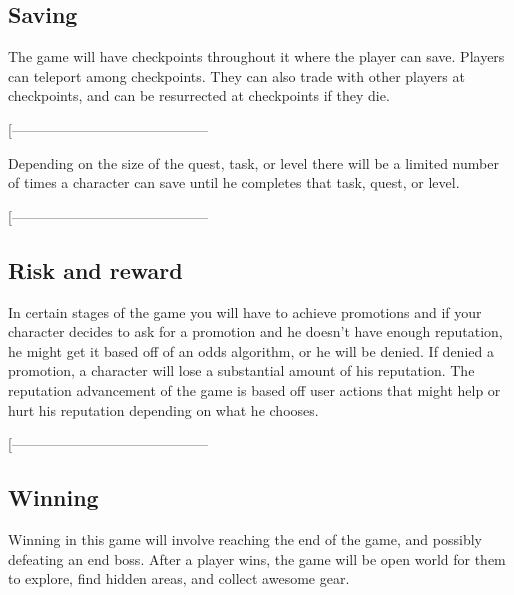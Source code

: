 \documentclass[9pt]{article}
\begin{document}
\subsection*{Saving}
The game will have checkpoints throughout it where the player can save. 
Players can teleport among checkpoints. They can also trade with other 
players at checkpoints, and can be resurrected at checkpoints if they die. 

\smallskip
[------------------------------------------
\smallskip

Depending on the size of the quest, task, or level there will be a limited number of times a character can save until he completes that task, quest, or level.

\smallskip
[------------------------------------------













\subsection*{Risk and reward}

In certain stages of the game you will have to achieve promotions and if your character decides to ask for a promotion and he doesn’t have enough reputation, he might get it based off of an odds algorithm, or he will be denied. If denied a promotion, a character will lose a substantial amount of his reputation. The reputation advancement of the game is based off user actions that might help or hurt his reputation depending on what he chooses.

\smallskip
[------------------------------------------
















\subsection*{Winning}
Winning in this game will involve reaching the end of the game, 
and possibly defeating an end boss. After a player wins, the 
game will be open world for them to explore, find hidden areas, 
and collect awesome gear. 
\end{document}
